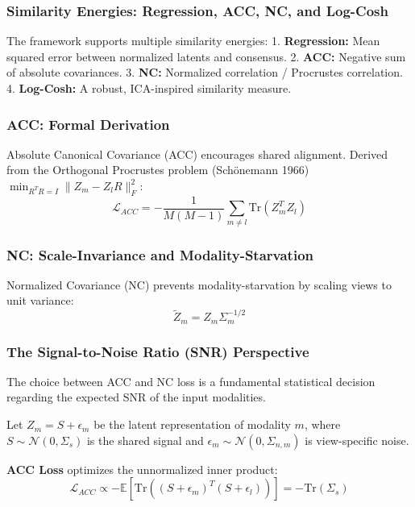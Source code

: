 \documentclass[
  letterpaper,
]{report}
\begin{document}
\subsubsection{Similarity Energies: Regression, ACC, NC, and
Log-Cosh}\label{similarity-energies-regression-acc-nc-and-log-cosh}

The framework supports multiple similarity energies: 1.
\textbf{Regression:} Mean squared error between normalized latents and
consensus. 2. \textbf{ACC:} Negative sum of absolute covariances. 3.
\textbf{NC:} Normalized correlation / Procrustes correlation. 4.
\textbf{Log-Cosh:} A robust, ICA-inspired similarity measure.

\subsubsection{ACC: Formal Derivation}\label{acc-formal-derivation}

Absolute Canonical Covariance (ACC) encourages shared alignment. Derived
from the Orthogonal Procrustes problem (Schönemann 1966)
\(\min_{R^T R = I} \| Z_m - Z_l R \|_F^2\):
\[ \mathcal{L}_{ACC} = - \frac{1}{M(M-1)} \sum_{m \neq l} \text{Tr}(Z_m^T Z_l) \]

\subsubsection{NC: Scale-Invariance and
Modality-Starvation}\label{nc-scale-invariance-and-modality-starvation}

Normalized Covariance (NC) prevents modality-starvation by scaling views
to unit variance: \[ \tilde{Z}_m = Z_m \Sigma_m^{-1/2} \]

\subsubsection{The Signal-to-Noise Ratio (SNR)
Perspective}\label{the-signal-to-noise-ratio-snr-perspective}

The choice between ACC and NC loss is a fundamental statistical decision
regarding the expected SNR of the input modalities.

Let \(Z_m = S + \epsilon_m\) be the latent representation of modality
\(m\), where \(S \sim \mathcal{N}(0, \Sigma_s)\) is the shared signal
and \(\epsilon_m \sim \mathcal{N}(0, \Sigma_{n,m})\) is view-specific
noise.

\textbf{ACC Loss} optimizes the unnormalized inner product:
\[ \mathcal{L}_{ACC} \propto - \mathbb{E}[\text{Tr}((S + \epsilon_m)^T (S + \epsilon_l))] = - \text{Tr}(\Sigma_s) \]
\end{document}

